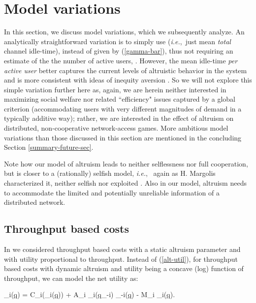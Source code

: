 \documentclass[12pt,onecolumn,draftcls]{IEEEtran}
\newcommand{\ie}{{\em i.e.},~}
\newcommand{\uq}{\underline{q}}
\newcommand{\be}{}
\begin{document}
\section{Model variations}\label{model-var-sec}

In this section, we discuss model variations, which we subsequently
analyze. An analytically
straightforward variation is to simply  use 
(\ie just mean {\em total} channel idle-time),
instead of  
given by (\ref{gamma-bar}),
thus not requiring an estimate of the
the number of active users, .  However, 
the mean idle-time {\em per active user}  
better captures the current levels of altruistic behavior
in the system and is more
consistent with ideas of inequity aversion \cite{fehr_inequity}.
So we will not explore this simple variation further here as, again,
we are herein neither interested in maximizing social welfare nor related 
``efficiency" issues
captured by a global criterion (accommodating
users with very different magnitudes of demand in a typically
additive way); rather, we are interested
in the effect of altruism on distributed, non-cooperative network-access games.
More ambitious  model variations than those discussed in this 
section  are mentioned in
the concluding Section \ref{summary-future-sec}.

Note how our model of altruism leads to neither selflessness nor full
cooperation,  but is closer to a (rationally) selfish model, \ie  
again
as H. Margolis characterized it, 
neither selfish nor exploited \cite{margolis07}.
Also in our model,
altruism needs to accommodate the limited and potentially unreliable
information of a distributed network.









\subsection{Throughput based costs}\label{throughput-costs}

In \cite{Kesidis10-cdc} we considered throughput based costs
with a static altruism parameter and with utility proportional to
throughput.  Instead of (\ref{alt-util}), for throughput based costs with
dynamic altruism and utility being a concave (log) function of throughput,
we can model the net utility as:
\be
{}_i(\uq)   =   
C_i\log(\gamma_i(\uq))  + A_i \alpha_i(\uq_{-i})
\overline{\gamma}_{-i}(\uq) - M_i \gamma_i(\uq).
\label{alt-util2}
\ee
\end{document}
